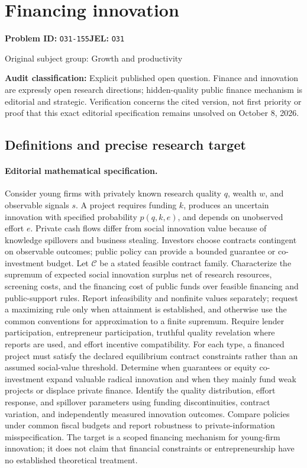 \documentclass[11pt,a4paper]{article}
\begin{document}
\section*{Financing innovation}
\textbf{Problem ID:} \texttt{O31-155}\quad \textbf{JEL:} \texttt{O31}\par
\label{problem:OP-0267}
{\sffamily\small\color{muted}Original subject group: Growth and productivity\par}
\label{definitions:problem:30007548}
\textbf{Audit classification:} Explicit published open question. Finance and innovation are expressly open research directions; hidden-quality public finance mechanism is editorial and strategic. Verification concerns the cited version, not first priority or proof that this exact editorial specification remains unsolved on October 8, 2026.
\subsection*{Definitions and precise research target}
\paragraph{Editorial mathematical specification.} Consider young firms with privately known research quality \(q\), wealth \(w\), and observable signals \(s\). A project requires funding \(k\), produces an uncertain innovation with specified probability \(p(q,k,e)\), and depends on unobserved effort \(e\). Private cash flows differ from social innovation value because of knowledge spillovers and business stealing. Investors choose contracts contingent on observable outcomes; public policy can provide a bounded guarantee or co-investment budget. Let \(\mathcal C\) be a stated feasible contract family.
Characterize the supremum of expected social innovation surplus net of research resources, screening costs, and the financing cost of public funds over feasible financing and public-support rules. Report infeasibility and nonfinite values separately; request a maximizing rule only when attainment is established, and otherwise use the common conventions for approximation to a finite supremum. Require lender participation, entrepreneur participation, truthful quality revelation where reports are used, and effort incentive compatibility. For each type, a financed project must satisfy the declared equilibrium contract constraints rather than an assumed social-value threshold.
Determine when guarantees or equity co-investment expand valuable radical innovation and when they mainly fund weak projects or displace private finance. Identify the quality distribution, effort response, and spillover parameters using funding discontinuities, contract variation, and independently measured innovation outcomes. Compare policies under common fiscal budgets and report robustness to private-information misspecification. The target is a scoped financing mechanism for young-firm innovation; it does not claim that financial constraints or entrepreneurship have no established theoretical treatment.
\end{document}
